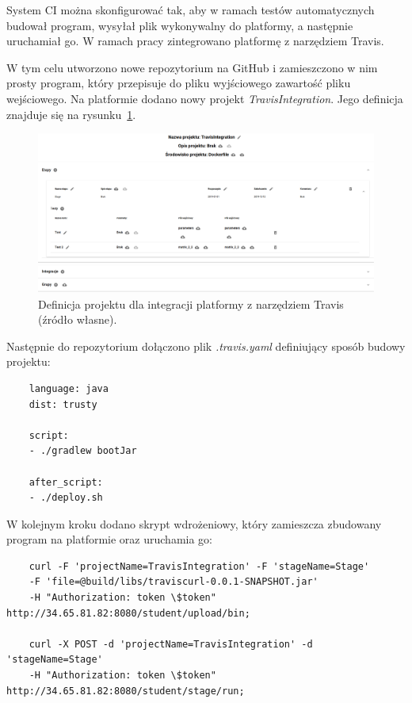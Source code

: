 System CI można skonfigurować tak, aby w ramach testów automatycznych budował program, wysyłał plik wykonywalny do platformy, a następnie uruchamiał go.
W ramach pracy zintegrowano platformę z narzędziem Travis.

W tym celu utworzono nowe repozytorium na GitHub i zamieszczono w nim prosty program, który przepisuje do pliku wyjściowego zawartość pliku wejściowego.
Na platformie dodano nowy projekt \textit{TravisIntegration}.
Jego definicja znajduje się na rysunku~\ref{fig:travis_integration}.

\begin{figure}[h]
    \centering
    \includegraphics[width = 12cm]{chapter05/travis_integration.png}
    \caption{Definicja projektu dla integracji platformy z narzędziem Travis (źródło własne).}
    \label{fig:travis_integration}
\end{figure}

Następnie do repozytorium dołączono plik \textit{.travis.yaml} definiujący sposób budowy projektu:

{\selectfont
\tiny
\begin{lstlisting}
    language: java
    dist: trusty

    script:
    - ./gradlew bootJar

    after_script:
    - ./deploy.sh
\end{lstlisting}
}

W kolejnym kroku dodano skrypt wdrożeniowy, który zamieszcza zbudowany program na platformie oraz uruchamia go:

{\selectfont
\tiny
\begin{lstlisting}
    curl -F 'projectName=TravisIntegration' -F 'stageName=Stage'
    -F 'file=@build/libs/traviscurl-0.0.1-SNAPSHOT.jar'
    -H "Authorization: token \$token" http://34.65.81.82:8080/student/upload/bin;

    curl -X POST -d 'projectName=TravisIntegration' -d 'stageName=Stage'
    -H "Authorization: token \$token" http://34.65.81.82:8080/student/stage/run;
\end{lstlisting}
}

